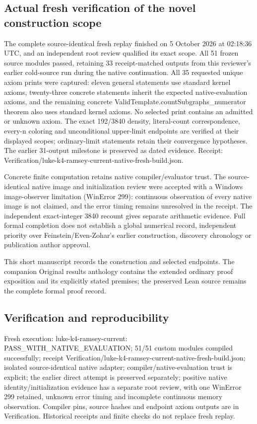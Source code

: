 \documentclass[11pt,a4paper]{article}
\begin{document}
\subsection{Actual fresh verification of the novel construction scope}
The complete source-identical fresh replay finished on 5 October 2026 at 02:18:36 UTC, and an independent root review qualified its exact scope. All 51 frozen source modules passed, retaining 33 receipt-matched outputs from this reviewer's earlier cold-source run during the native continuation. All 35 requested unique axiom prints were captured: eleven general statements use standard kernel axioms, twenty-three concrete statements inherit the expected native-evaluation axioms, and the remaining concrete ValidTemplate.countSubgraphs\_numerator theorem also uses standard kernel axioms. No selected print contains an admitted or unknown axiom. The exact 192/3840 density, literal-count correspondence, every-n coloring and unconditional upper-limit endpoints are verified at their displayed scopes; ordinary-limit statements retain their convergence hypotheses. The earlier 31-output milestone is preserved as dated evidence. Receipt: Verification/luke-k4-ramsey-current-native-fresh-build.json.

Concrete finite computation retains native compiler/evaluator trust. The source-identical native image and initialization review were accepted with a Windows image-observer limitation (WinError 299): continuous observation of every native image is not claimed, and the error timing remains unresolved in the receipt. The independent exact-integer 3840 recount gives separate arithmetic evidence. Full formal completion does not establish a global numerical record, independent priority over Feinstein/Even-Zohar's earlier construction, discovery chronology or publication author approval.

{\small This short manuscript records the construction and selected endpoints. The companion Original results anthology contains the extended ordinary proof exposition and its explicitly stated premises; the preserved Lean source remains the complete formal proof record.\par}

\subsection{Verification and reproducibility}
Fresh execution: luke-k4-ramsey-current: PASS\_WITH\_NATIVE\_EVALUATION; 51/51 custom modules compiled successfully; receipt Verification/luke-k4-ramsey-current-native-fresh-build.json; isolated source-identical native adapter; compiler/native-evaluation trust is explicit; the earlier direct attempt is preserved separately; positive native identity/initialization evidence has a separate root review, with one WinError 299 retained, unknown error timing and incomplete continuous memory observation. Compiler pins, source hashes and endpoint axiom outputs are in Verification. Historical receipts and finite checks do not replace fresh replay.
\end{document}
